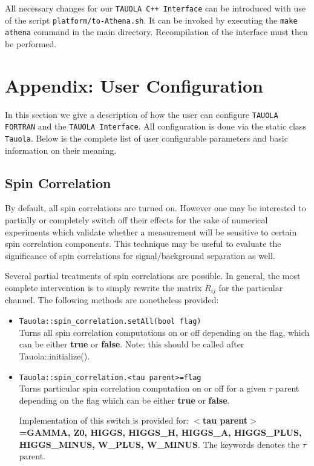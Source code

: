 \documentclass[]{Tauola_interface_design}
\begin{document}
All necessary changes for our {\tt TAUOLA C++ Interface} can be introduced 
with use of the script {\tt platform/to-Athena.sh}.
It can be invoked by 
executing the {\tt make athena} command in the main directory. 
Recompilation of the interface must then be performed.



\section{Appendix: User  Configuration}
\label{sec:User Configuration}
In this section we give a description of how the user can configure {\tt TAUOLA FORTRAN}
and the {\tt TAUOLA Interface}.
All configuration is done via the static class {\tt Tauola}. Below is the 
complete list of user configurable parameters and basic information on their
meaning.

\subsection{Spin Correlation}
By default, all spin correlations are turned on. However one may be interested
to  partially or completely switch off their effects for the sake of numerical 
experiments which validate whether a measurement will be sensitive to certain spin correlation 
components.
This technique may be useful to evaluate the significance of spin correlations for 
signal/background separation as well. 

Several partial treatments of spin correlations
are possible. In general, the most complete   intervention is to simply rewrite the matrix $R_{ij}$ 
for the particular channel. The following methods are nonetheless provided:

\begin{itemize}
 \item {\tt Tauola::spin\_correlation.setAll(bool flag)} \hfill \\
Turns all spin correlation computations on or off depending on the flag, which can be either \textbf{true} or \textbf{false}.
Note: this should be called after Tauola::initialize().
 \item {\tt Tauola::spin\_correlation.<tau parent>=flag} \hfill \\
Turns particular spin correlation computation on or off for a given $\tau$ parent depending on the flag which can be either
\textbf{true} or \textbf{false}. 


Implementation of this switch is provided for: \textbf{$<$tau parent$>$=GAMMA, Z0, HIGGS, HIGGS\_H, HIGGS\_A, 
HIGGS\_PLUS, HIGGS\_MINUS, W\_PLUS, W\_MINUS}. The keywords denotes the $\tau$ parent.

\end{itemize}
\end{document}
